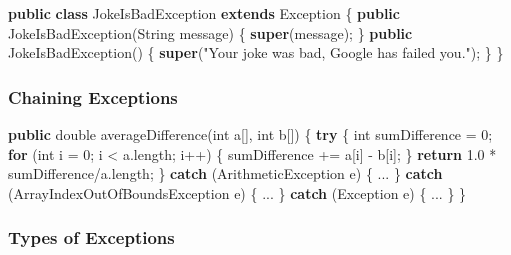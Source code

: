 \documentclass[]{article}
\newenvironment{Shaded}{}{}
\newcommand{\BuiltInTok}[1]{#1}
\newcommand{\DataTypeTok}[1]{\textcolor[rgb]{0.56,0.13,0.00}{#1}}
\newcommand{\DecValTok}[1]{\textcolor[rgb]{0.25,0.63,0.44}{#1}}
\newcommand{\FloatTok}[1]{\textcolor[rgb]{0.25,0.63,0.44}{#1}}
\newcommand{\FunctionTok}[1]{\textcolor[rgb]{0.02,0.16,0.49}{#1}}
\newcommand{\KeywordTok}[1]{\textcolor[rgb]{0.00,0.44,0.13}{\textbf{#1}}}
\newcommand{\NormalTok}[1]{#1}
\newcommand{\StringTok}[1]{\textcolor[rgb]{0.25,0.44,0.63}{#1}}
\begin{document}
\begin{Shaded}
\begin{Highlighting}[]
\KeywordTok{public} \KeywordTok{class}\NormalTok{ JokeIsBadException }\KeywordTok{extends} \BuiltInTok{Exception}\NormalTok{ \{}
    \KeywordTok{public} \FunctionTok{JokeIsBadException}\NormalTok{(}\BuiltInTok{String}\NormalTok{ message) \{}
        \KeywordTok{super}\NormalTok{(message);}
\NormalTok{    \}}
    \KeywordTok{public} \FunctionTok{JokeIsBadException}\NormalTok{() \{}
        \KeywordTok{super}\NormalTok{(}\StringTok{"Your joke was bad, Google has failed you."}\NormalTok{);}
\NormalTok{    \}}
\NormalTok{\}}
\end{Highlighting}
\end{Shaded}

\hypertarget{chaining-exceptions}{%
\subsubsection{Chaining Exceptions}\label{chaining-exceptions}}

\begin{Shaded}
\begin{Highlighting}[]
\KeywordTok{public} \DataTypeTok{double} \FunctionTok{averageDifference}\NormalTok{(}\DataTypeTok{int}\NormalTok{ a[], }\DataTypeTok{int}\NormalTok{ b[]) \{}
    \KeywordTok{try}\NormalTok{ \{}
        \DataTypeTok{int}\NormalTok{ sumDifference = }\DecValTok{0}\NormalTok{;}
        \KeywordTok{for}\NormalTok{ (}\DataTypeTok{int}\NormalTok{ i = }\DecValTok{0}\NormalTok{; i < a.}\FunctionTok{length}\NormalTok{; i++) \{}
\NormalTok{            sumDifference += a[i] - b[i];}
\NormalTok{        \}}
        \KeywordTok{return} \FloatTok{1.0}\NormalTok{ * sumDifference/a.}\FunctionTok{length}\NormalTok{;}
\NormalTok{    \} }\KeywordTok{catch}\NormalTok{ (}\BuiltInTok{ArithmeticException}\NormalTok{ e) \{}
\NormalTok{        ...}
\NormalTok{    \} }\KeywordTok{catch}\NormalTok{ (}\BuiltInTok{ArrayIndexOutOfBoundsException}\NormalTok{ e) \{}
\NormalTok{        ...}
\NormalTok{    \} }\KeywordTok{catch}\NormalTok{ (}\BuiltInTok{Exception}\NormalTok{ e) \{}
\NormalTok{        ...}
\NormalTok{    \}}
\NormalTok{\}}
\end{Highlighting}
\end{Shaded}

\hypertarget{types-of-exceptions}{%
\subsubsection{Types of Exceptions}\label{types-of-exceptions}}
\end{document}
